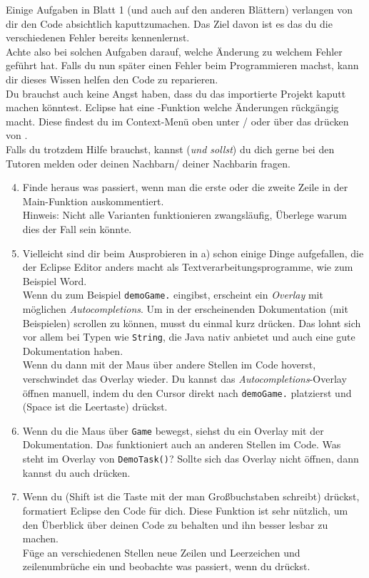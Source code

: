 \begin{Infobox}[Fehler]
    Einige Aufgaben in Blatt 1 (und auch auf den anderen Blättern) verlangen von dir den Code absichtlich kaputtzumachen.
    Das Ziel davon ist es das du die verschiedenen Fehler bereits kennenlernst.\\
    Achte also bei solchen Aufgaben darauf, welche Änderung zu welchem Fehler geführt hat.
    Falls du nun später einen Fehler beim Programmieren machst, kann dir dieses Wissen helfen den Code zu reparieren.\\
    Du brauchst auch keine Angst haben, dass du das importierte Projekt kaputt machen könntest.
    Eclipse hat eine -Funktion welche Änderungen rückgängig macht.
    Diese findest du im Context-Menü oben unter / oder über das drücken von .\\
    Falls du trotzdem Hilfe brauchst, kannst (\emph{und sollst}) du dich gerne bei den Tutoren melden oder deinen Nachbarn/ deiner Nachbarin fragen.
\end{Infobox}


\begin{enumerate} \setcounter{enumi}{3}
\item Finde heraus was passiert, wenn man die erste oder die zweite Zeile in der Main-Funktion auskommentiert.\\
Hinweis: Nicht alle Varianten funktionieren zwangsläufig, Überlege warum dies der Fall sein könnte.
\item Vielleicht sind dir beim Ausprobieren in a) schon einige Dinge aufgefallen, die der Eclipse Editor anders macht als Textverarbeitungsprogramme, wie zum Beispiel Word.\\
Wenn du zum Beispiel \lstinline{demoGame.} eingibst, erscheint ein \textit{Overlay} mit möglichen \textit{Autocompletions}. Um in der erscheinenden Dokumentation (mit Beispielen) scrollen zu können, musst du einmal kurz  drücken. Das lohnt sich vor allem bei Typen wie \lstinline{String}, die Java nativ anbietet und auch eine gute Dokumentation haben.\\
Wenn du dann mit der Maus über andere Stellen im Code hoverst, verschwindet das Overlay wieder.
Du kannst das \textit{Autocompletions}-Overlay öffnen manuell, indem du den Cursor direkt nach \lstinline{demoGame.} platzierst und  (Space ist die Leertaste) drückst.
\item
Wenn du die Maus über \lstinline{Game} bewegst, siehst du ein Overlay mit der Dokumentation.
Das funktioniert auch an anderen Stellen im Code.
Was steht im Overlay von \lstinline{DemoTask()}? Sollte sich das Overlay nicht öffnen, dann kannst du auch  drücken.
\item
Wenn du  (Shift ist die Taste mit der man Großbuchstaben schreibt) drückst, formatiert Eclipse den Code für dich. Diese Funktion ist sehr nützlich, um den Überblick über deinen Code zu behalten und ihn besser lesbar zu machen.\\
Füge an verschiedenen Stellen neue Zeilen und Leerzeichen und zeilenumbrüche ein und beobachte was passiert, wenn du  drückst.
\end{enumerate}


